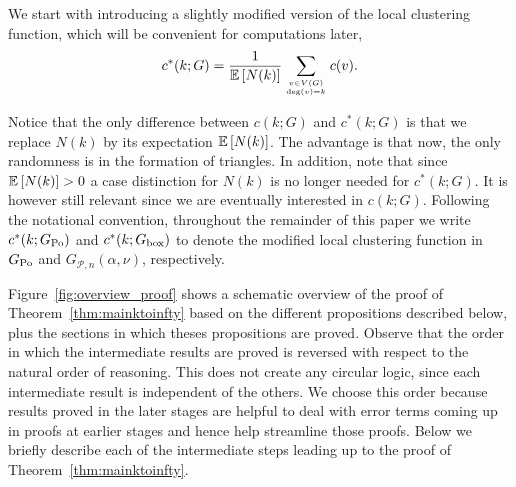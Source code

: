 We start with introducing a slightly modified version of the local clustering function, which will be convenient for computations later,
\begin{equation}\label{eq:def_local_clustering_ast_general}
	c^\ast(k;G) = \frac{1}{\mathbb{E}\left[N(k)\right]} \sum_{v \in V(G) \atop \text{deg}(v)=k} c(v).
\end{equation}

Notice that the only difference between $c(k;G)$ and $c^\ast(k;G)$ is that we replace $N(k)$ by its expectation $\mathbb{E}\left[N(k)\right]$. The advantage is that now, the only randomness is in the formation of triangles. In addition, note that since $\mathbb{E}\left[N(k)\right] > 0$ a case distinction for $N(k)$ is no longer needed for $c^\ast(k;G)$. It is however still relevant since we are eventually interested in $c(k;G)$. Following the notational convention, throughout the remainder of this paper we write $c^\ast(k; G_{{\mathrm{Po}}})$ and $c^\ast(k; G_{\mathrm{box}})$ to denote the modified local clustering function in $G_{{\mathrm{Po}}}$ and $G_{\mathcal{P},n}(\alpha,\nu)$, respectively.

Figure~\ref{fig:overview_proof} shows a schematic overview of the proof of Theorem~\ref{thm:mainktoinfty} based on the different propositions described below, plus the sections in which theses propositions are proved. Observe that the order in which the intermediate results are proved is reversed with respect to the natural order of reasoning. This does not create any circular logic, since each intermediate result is independent of the others. We choose this order because results proved in the later stages are helpful to deal with error terms coming up in proofs at earlier stages and hence help streamline those proofs. Below we briefly describe each of the intermediate steps leading up to the proof of Theorem~\ref{thm:mainktoinfty}. 


